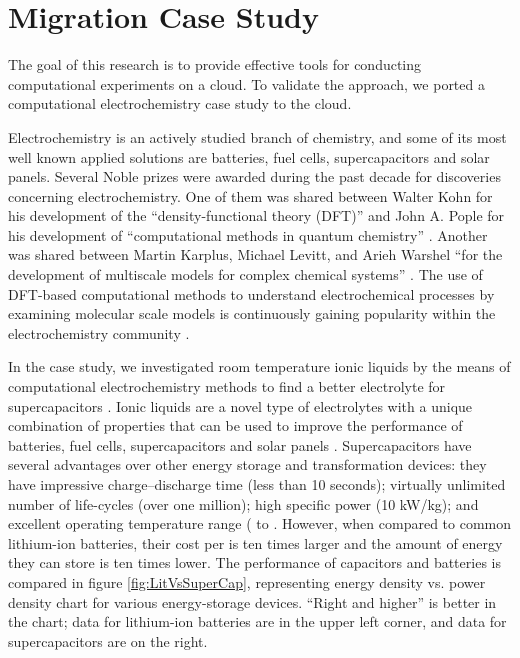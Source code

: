 \documentclass[a4paper,10pt]{article}
\begin{document}
\section{Migration Case Study}
\label{casestudy}

The goal of this research is to provide effective tools for conducting computational experiments on a cloud. To validate the approach, we ported a computational electrochemistry case study to the cloud. 

Electrochemistry is an actively studied branch of chemistry, and some of its most well known applied solutions are batteries, fuel cells, supercapacitors and solar panels. Several Noble prizes were awarded during the past decade for discoveries concerning electrochemistry. One of them was shared between Walter Kohn for his development of the ``density-functional theory (DFT)'' and John A. Pople for his development of ``computational methods in quantum chemistry'' \cite{nobel1998}. Another was shared between Martin Karplus, Michael Levitt, and Arieh Warshel ``for the development of multiscale models for complex chemical systems'' \cite{nobel2013}. The use of DFT-based computational methods to understand electrochemical processes by examining molecular scale models is continuously gaining popularity within the electrochemistry community \cite{Calle-vallejo2012,Anderson2012}.

In the case study, we investigated room temperature ionic liquids \cite{Fedorov2014} by the means of computational electrochemistry methods to find a better electrolyte for supercapacitors \cite{Conway1999}. Ionic liquids are a novel type of electrolytes with a unique combination of properties that can be used to improve the performance of batteries, fuel cells, supercapacitors and solar panels \cite{Fedorov2014}. Supercapacitors have several advantages over other energy storage and transformation devices: they have impressive charge--discharge time (less than 10 seconds); virtually unlimited number of life-cycles (over one million); high specific power (10 kW/kg); and excellent operating temperature range ( to  \cite{lewandowski2004}. However, when compared to common lithium-ion batteries, their cost per  is ten times larger and the amount of energy they can store is ten times lower. The performance of capacitors and batteries is compared in figure \ref{fig:LitVsSuperCap}, representing energy density vs. power density chart for various energy-storage devices. ``Right and higher'' is better in the chart; data for lithium-ion batteries are in the upper left corner, and data for supercapacitors are on the right.  
\end{document}

